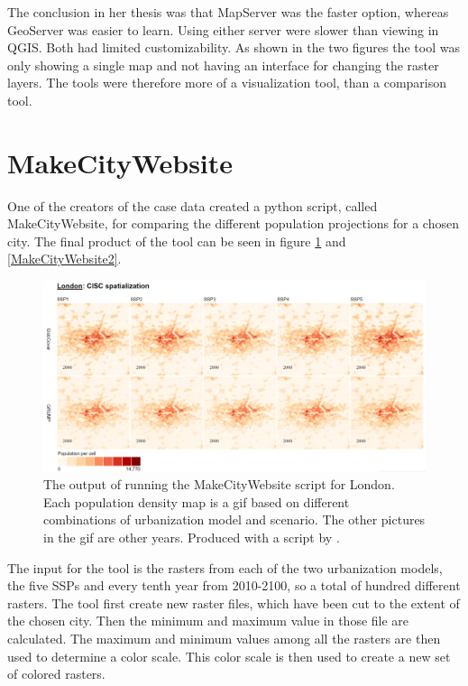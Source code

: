 The conclusion in her thesis was that MapServer was the faster option, whereas GeoServer was easier to learn. Using either server were slower than viewing in QGIS. Both had limited customizability. As shown in the two figures the tool was only showing a single map and not having an interface for changing the raster layers. The tools were therefore more of a visualization tool, than a comparison tool. \citep{Sarah}



\section{MakeCityWebsite}\label{MakeCitySection}
One of the creators of the case data created a python script, called MakeCityWebsite, for comparing the different population projections for a chosen city.  The final product of the tool can be seen in figure \ref{MakeCityWebsite1} and \ref{MakeCityWebsite2}. 

\begin{figure} [H]
	\centering
	\includegraphics[width=1\textwidth]{Pictures/MakeCityWebsite1}
	\caption{The output of running the MakeCityWebsite script for London. Each population density map is a gif based on different combinations of urbanization model and scenario. The other pictures in the gif are other years. Produced with a script by \citet{MakeCityWebsite}.}
	\label{MakeCityWebsite1}
\end{figure}

The input for the tool is the rasters from each of the two urbanization models, the five SSPs and every tenth year from 2010-2100, so a total of hundred different rasters.
The tool first create new raster files, which have been cut to the extent of the chosen city. Then the minimum and maximum value in those file are calculated. The maximum and minimum values among all the rasters are then used to determine a color scale. This color scale is then used to create a new set of colored rasters.

